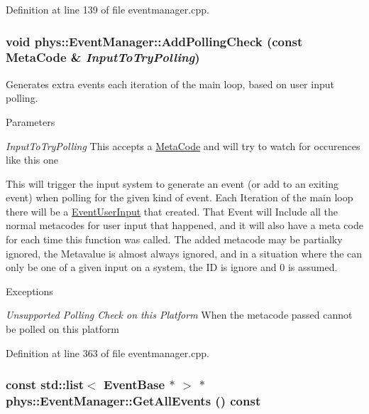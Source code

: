 Definition at line 139 of file eventmanager.cpp.

\hypertarget{classphys_1_1EventManager_a6ff66883358344908afd11204f79f196}{
\subsubsection[{AddPollingCheck}]{\setlength{\rightskip}{0pt plus 5cm}void phys::EventManager::AddPollingCheck (const {\bf MetaCode} \& {\em InputToTryPolling})}}
\label{da/dde/classphys_1_1EventManager_a6ff66883358344908afd11204f79f196}


Generates extra events each iteration of the main loop, based on user input polling. 


\begin{DoxyParams}{Parameters}
\item[{\em InputToTryPolling}]This accepts a \hyperlink{classphys_1_1MetaCode}{MetaCode} and will try to watch for occurences like this one\end{DoxyParams}
This will trigger the input system to generate an event (or add to an exiting event) when polling for the given kind of event. Each Iteration of the main loop there will be a \hyperlink{classphys_1_1EventUserInput}{EventUserInput} that created. That Event will Include all the normal metacodes for user input that happened, and it will also have a meta code for each time this function was called. The added metacode may be partialky ignored, the Metavalue is almost always ignored, and in a situation where the can only be one of a given input on a system, the ID is ignore and 0 is assumed. 
\begin{DoxyExceptions}{Exceptions}
\item[{\em Unsupported Polling Check on this Platform}]When the metacode passed cannot be polled on this platform \end{DoxyExceptions}


Definition at line 363 of file eventmanager.cpp.

\hypertarget{classphys_1_1EventManager_a1c17bf26ec80f2be30cdb090534cacf8}{
\subsubsection[{GetAllEvents}]{\setlength{\rightskip}{0pt plus 5cm}const std::list$<$ {\bf EventBase} $\ast$ $>$ $\ast$ phys::EventManager::GetAllEvents () const}}
\label{da/dde/classphys_1_1EventManager_a1c17bf26ec80f2be30cdb090534cacf8}


